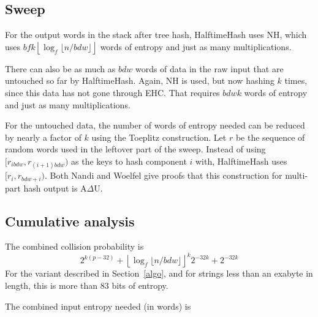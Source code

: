 \documentclass[runningheads]{llncs}
\begin{document}


\subsection{Sweep}

For the output words in the stack after tree hash, HalftimeHash uses NH, which uses $b f k \left\lfloor \log_f \lfloor n / b d w \rfloor \right\rfloor$ words of entropy and just as many multiplications.

There can also be as much as $b d w$ words of data in the raw input that are untouched so far by HalftimeHash.
Again, NH is used, but now hashing $k$ times, since this data has not gone through EHC.
That requires $b d w k$ words of entropy and just as many multiplications.

For the untouched data, the number of words of entropy needed can be reduced by nearly a factor of $k$ using the Toeplitz construction.
Let $r$ be the sequence of random words used in the leftover part of the sweep.
Instead of using $[r_{i b d w}, r_{(i+1)b d w})$ as the keys to hash component $i$ with, HalftimeHash uses $[r_{i}, r_{b d w + i})$.
Both Nandi and Woelfel give proofs that this construction for multi-part hash output is A$\Delta$U. \cite{ehc-nandi,woelfel-toeplitz}


\subsection{Cumulative analysis}

The combined collision probability is
\[2^{k(p-32)} + \left\lfloor \log_f \lfloor n / b d w \rfloor \right\rfloor^k 2^{-32k} + 2^{-32k}\]
For the variant described in Section~\ref{algo}, and for strings less than an exabyte in length, this is more than 83 bits of entropy.

The combined input entropy needed (in words) is
\end{document}
